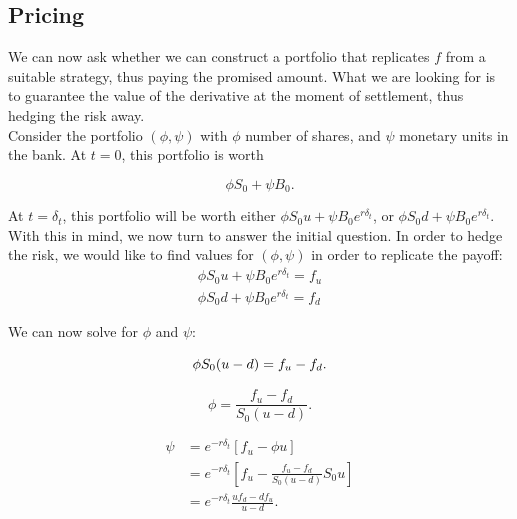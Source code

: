 \documentclass[../TGMAFFIRO.tex]{subfiles}
\begin{document}
\begin{figure}[h!]
\centering
{}
\end{figure}


\subsection{Pricing}
We can now ask whether we can construct a portfolio that replicates $f$ from a suitable strategy, thus paying the promised amount. What we are looking for is to guarantee the value of the derivative at the moment of settlement, thus hedging the risk away.\\

Consider the portfolio $(\phi, \psi)$ with $\phi$ number of shares, and $\psi$ monetary units in the bank. At $t=0$, this portfolio is worth

\[
    \phi S_0 + \psi B_0.
\]

At $t=\delta_t$, this portfolio will be worth either $\phi S_0u + \psi B_0e^{r \delta_t}$, or $\phi S_0d + \psi B_0e^{r \delta_t}$.\\

With this in mind, we now turn to answer the initial question. In order to hedge the risk, we would like to find values for $(\phi, \psi)$ in order to replicate the payoff:
\begin{align*}
    \phi S_0u + \psi B_0e^{r \delta_t} = f_u\\
    \phi S_0d + \psi B_0e^{r \delta_t} = f_d
\end{align*}

We can now solve for $\phi$ and $\psi$:

\begin{equation*}
    \phi S_0(u - d) = f_u - f_d.\\
\end{equation*}

\begin{equation} \label{eq:phi}
    \phi = \frac{f_u - f_d}{S_0(u-d)}.
\end{equation}

\begin{align*}
    \psi &= e^{-r\delta_t} [f_u - \phi u]\\
         &= e^{-r\delta_t} \left[f_u - \frac{f_u - f_d}{S_0(u - d)} S_0u\right]\\
         &= e^{-r\delta_t} \frac{uf_d - df_u}{u -d}.
\end{align*}
\end{document}
